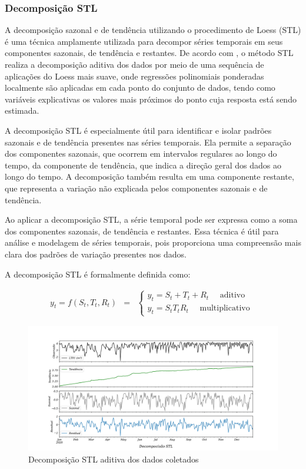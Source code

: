 \subsubsection{Decomposi\c c\~ao STL}\label{subsubsec:stl}

A decomposição sazonal e de tendência utilizando o procedimento de Loess (STL) é uma técnica amplamente utilizada para decompor séries temporais em seus componentes sazonais, de tendência e restantes. De acordo com , o método STL realiza a decomposição aditiva dos dados por meio de uma sequência de aplicações do Loess mais suave, onde regressões polinomiais ponderadas localmente são aplicadas em cada ponto do conjunto de dados, tendo como variáveis explicativas os valores mais próximos do ponto cuja resposta está sendo estimada.

A decomposição STL é especialmente útil para identificar e isolar padrões sazonais e de tendência presentes nas séries temporais. Ela permite a separação dos componentes sazonais, que ocorrem em intervalos regulares ao longo do tempo, da componente de tendência, que indica a direção geral dos dados ao longo do tempo. A decomposição também resulta em uma componente restante, que representa a variação não explicada pelos componentes sazonais e de tendência.

Ao aplicar a decomposição STL, a série temporal pode ser expressa como a soma dos componentes sazonais, de tendência e restantes. Essa técnica é útil para análise e modelagem de séries temporais, pois proporciona uma compreensão mais clara dos padrões de variação presentes nos dados.

A decomposição STL é formalmente definida como:

\begin{eqnarray}
	y_t=f\left(S_t, T_t, R_t\right)&=&\left\{\begin{array}{l}
		y_t=S_t+T_t+R_t \quad \text { aditivo } \\
		y_t=S_t T_t R_t \quad \text { multiplicativo }
	\end{array}\right. \label{eq:stl}
\end{eqnarray}

\begin{figure}[htp!]
	\centering
	\caption{Decomposição STL aditiva dos dados coletados}
	\label{fig:stl-aditiva}
	\includegraphics[width=0.9\linewidth]{"Resultados/Figuras/STL aditiva"}
	
\end{figure}


